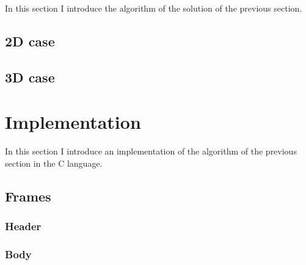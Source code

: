 \documentclass[12pt, a4paper]{article}
\begin{document}
In this section I introduce the algorithm of the solution of the previous section.\\

\subsection{2D case}

\begin{scriptsize}
\begin{ttfamily}

\end{ttfamily}
\end{scriptsize}

\subsection{3D case}

\begin{scriptsize}
\begin{ttfamily}

\end{ttfamily}
\end{scriptsize}

\section{Implementation}

In this section I introduce an implementation of the algorithm of the previous section in the C language.\\

\subsection{Frames}

\subsubsection{Header}

\begin{scriptsize}
\begin{ttfamily}

\end{ttfamily}
\end{scriptsize}

\subsubsection{Body}

\begin{scriptsize}
\begin{ttfamily}

\end{ttfamily}
\end{scriptsize}
\end{document}
